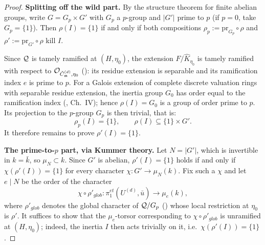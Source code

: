 \begin{proof}
    \textbf{Splitting off the wild part.}
    By the structure theorem for finite abelian groups, write $G = G_p \times G'$ with $G_p$ a $p$-group
    and $|G'|$ prime to $p$ (if $p = 0$, take $G_p = \{1\}$). Then
    $\rho(I) = \{1\}$ if and only if both compositions
    $\rho_p := \mathrm{pr}_{G_p} \circ \rho$ and $\rho' := \mathrm{pr}_{G'} \circ \rho$ kill $I$.

    Since $\mathcal{Q}$ is tamely ramified at $(H, \eta_0)$, the extension $F/\widehat{K}_{\eta_0}$ is tamely
    ramified with respect to $\mathcal{O}_{\tilde{C}_{\mathfrak{m}}^{(d)}, \eta_0}$ (): its
    residue extension is separable and its ramification index $e$ is prime to $p$. For a Galois
    extension of complete discrete valuation rings with separable residue extension, the inertia group
    $G_0$ has order equal to the ramification index (\cite{serreLF}, Ch.\ IV); hence
    $\rho(I) = G_0$ is a group of order prime to $p$. Its projection to the $p$-group $G_p$ is then
    trivial, that is:
    \[ \rho_p(I) = \{1\}, \qquad \rho(I) \subseteq \{1\} \times G'. \]
    It therefore remains to prove $\rho'(I) = \{1\}$.

    \textbf{The prime-to-$p$ part, via Kummer theory.}
    Let $N = |G'|$, which is invertible in $k = \bar{k}$, so $\mu_N \subset k$. Since $G'$ is abelian,
    $\rho'(I) = \{1\}$ holds if and only if $\chi(\rho'(I)) = \{1\}$ for every character
    $\chi : G' \to \mu_N(k)$. Fix such a $\chi$ and let $e \mid N$ be the order of the character
    \[ \chi \circ \rho'_{glob} : \pi_1^{et}(U^{(d)}, \bar{u}) \longrightarrow \mu_e(k), \]
    where $\rho'_{glob}$ denotes the global character of $\mathcal{Q} / G_p$ ()
    whose local restriction at $\eta_0$ is $\rho'$. It suffices to show that the $\mu_e$-torsor
    corresponding to $\chi \circ \rho'_{glob}$ is unramified at $(H, \eta_0)$; indeed, the inertia $I$
    then acts trivially on it, i.e.\ $\chi(\rho'(I)) = \{1\}$.


\end{proof}
